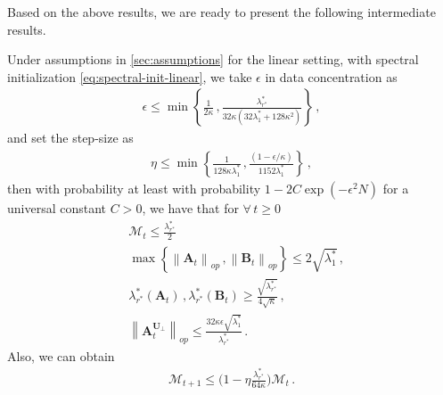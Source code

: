 Based on the above results, we are ready to present the following intermediate results.
\begin{lemma}
\label{linear-induction-gd}
    Under assumptions in \cref{sec:assumptions} for the linear setting, with spectral initialization \eqref{eq:spectral-init-linear}, we take $\epsilon$ in data concentration as
    \begin{align*}
        \epsilon \leq \min\left\{\frac{1}{2\kappa}\,,\frac{\lambda^*_{r^*}}{32\kappa(32 \lambda_1^*+128 \kappa^2)}\right\}\,,
    \end{align*}
    and set the step-size as
    \begin{align*}
        \eta \leq \min\left\{\frac{1}{128\kappa\lambda_1^*}\,,\frac{(1-\epsilon/\kappa)}{1152\lambda^*_{1}}\right\}\,,
    \end{align*}
    then with probability at least with probability $1- 2C\exp(-\epsilon^2 N)$ for a universal constant $C>0$, we have that for $\forall\,t\geq 0$
    \begin{align}
        & \mathcal{M}_t \leq \frac{\lambda^*_{r^*}}{2} \label{M}\\
        & \max\left\{\left\|\bm A_{t}\right\|_{op}\,,\left\|\bm B_{t}\right\|_{op}\right\}\leq 2\sqrt{\lambda_1^*}\,, \label{upper}\\
        & \lambda_{r^*}^*\left(\bm A_t\right)\,,\lambda_{r^*}^*\left(\bm B_t\right) \geq \frac{\sqrt{\lambda_{r^*}^*}}{4\sqrt{\kappa}} \,,\label{lower}\\
        & \left\|\bm A^{\bm U_\perp}_{t}\right\|_{op} \leq \frac{32 \kappa \epsilon\sqrt{\lambda_1^*}}{\lambda^*_{r^*}}\,. \label{res-A}
    \end{align}
    Also, we can obtain
    \begin{align}
        \mathcal{M}_{t+1} \leq \bigg(1-\eta \frac{\lambda^*_{r^*}}{64\kappa}\bigg)\mathcal{M}_t \label{ML}\,.
    \end{align}
\end{lemma}
